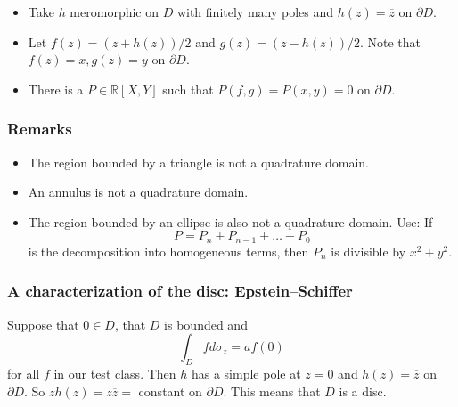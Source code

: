 \documentclass{beamer}
\begin{document}
\begin{frame}

\begin{itemize}

 \item Take $h$ meromorphic on $D$ with finitely many poles and $h(z) = \overline z$ on $\partial D$.

\medskip

 \item Let $f(z) = (z + h(z))/2$ and $g(z) = (z - h(z))/2$. Note that $f(z) = x, g(z) = y$ on $\partial D$.

\medskip

 \item There is a $P \in \mathbb R[X, Y]$ such that $P(f, g) = P(x, y) = 0$ on $\partial D$.

\end{itemize}

\end{frame}


\begin{frame}

 \frametitle{Remarks}
 
\begin{itemize}
  
 \item The region bounded by a triangle is not a quadrature domain.

 \item An annulus is not a quadrature domain.

 \item The region bounded by an ellipse is also not a quadrature domain. Use: If
\[
P = P_n + P_{n-1} + \ldots + P_0
\]
 is the decomposition into homogeneous terms, then $P_n$ is divisible by $x^2 + y^2$.

\end{itemize}

\end{frame}


\begin{frame}
 \frametitle{A characterization of the disc: Epstein--Schiffer}

Suppose that $0 \in D$, that $D$ is bounded and 
\[
\int_D f d \sigma_z = a f(0)
\]
for all $f$ in our test class. Then $h$ has a simple pole at $z = 0$ and $h(z) = \overline z$ on $\partial D$. So $z h(z) = z \overline z =$ constant on $\partial D$. This means that 
$D$ is a disc.


\end{frame}
\end{document}
